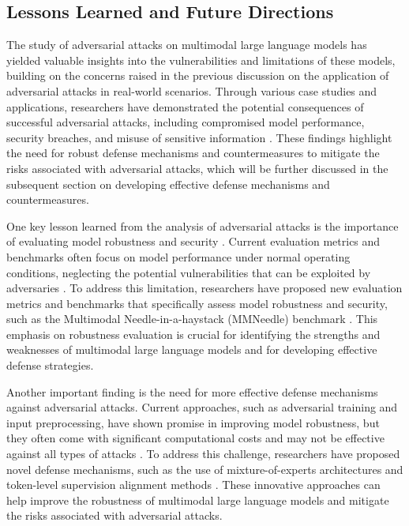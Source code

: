 \documentclass[11pt,a4paper]{article}
\begin{document}
\subsection{Lessons Learned and Future Directions}


The study of adversarial attacks on multimodal large language models has yielded valuable insights into the vulnerabilities and limitations of these models, building on the concerns raised in the previous discussion on the application of adversarial attacks in real-world scenarios. Through various case studies and applications, researchers have demonstrated the potential consequences of successful adversarial attacks, including compromised model performance, security breaches, and misuse of sensitive information \cite{arxiv:2401.13601}. These findings highlight the need for robust defense mechanisms and countermeasures to mitigate the risks associated with adversarial attacks, which will be further discussed in the subsequent section on developing effective defense mechanisms and countermeasures.

One key lesson learned from the analysis of adversarial attacks is the importance of evaluating model robustness and security \cite{arxiv:2408.08632}. Current evaluation metrics and benchmarks often focus on model performance under normal operating conditions, neglecting the potential vulnerabilities that can be exploited by adversaries \cite{arxiv:2407.15272}. To address this limitation, researchers have proposed new evaluation metrics and benchmarks that specifically assess model robustness and security, such as the Multimodal Needle-in-a-haystack (MMNeedle) benchmark \cite{arxiv:2406.11230}. This emphasis on robustness evaluation is crucial for identifying the strengths and weaknesses of multimodal large language models and for developing effective defense strategies.

Another important finding is the need for more effective defense mechanisms against adversarial attacks. Current approaches, such as adversarial training and input preprocessing, have shown promise in improving model robustness, but they often come with significant computational costs and may not be effective against all types of attacks \cite{arxiv:2401.02906}. To address this challenge, researchers have proposed novel defense mechanisms, such as the use of mixture-of-experts architectures \cite{arxiv:2407.12709} and token-level supervision alignment methods \cite{arxiv:2408.11813}. These innovative approaches can help improve the robustness of multimodal large language models and mitigate the risks associated with adversarial attacks.
\end{document}
